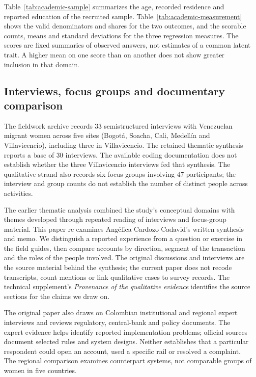 Table~\ref{tab:academic-sample} summarizes the age, recorded residence and reported education of the recruited sample. Table~\ref{tab:academic-measurement} shows the valid denominators and shares for the two outcomes, and the scorable counts, means and standard deviations for the three regression measures. The scores are fixed summaries of observed answers, not estimates of a common latent trait. A higher mean on one score than on another does not show greater inclusion in that domain.




\subsection{Interviews, focus groups and documentary comparison}

The fieldwork archive records 33 semistructured interviews with Venezuelan migrant women across five sites (Bogotá, Soacha, Cali, Medellín and Villavicencio), including three in Villavicencio. The retained thematic synthesis reports a base of 30 interviews. The available coding documentation does not establish whether the three Villavicencio interviews fed that synthesis. The qualitative strand also records six focus groups involving 47 participants; the interview and group counts do not establish the number of distinct people across activities.

The earlier thematic analysis combined the study's conceptual domains with themes developed through repeated reading of interviews and focus-group material. This paper re-examines Angélica Cardozo Cadavid's written synthesis and memo. We distinguish a reported experience from a question or exercise in the field guides, then compare accounts by direction, segment of the transaction and the roles of the people involved. The original discussions and interviews are the source material behind the synthesis; the current paper does not recode transcripts, count mentions or link qualitative cases to survey records. The technical supplement's \emph{Provenance of the qualitative evidence} identifies the source sections for the claims we draw on.

The original paper also draws on Colombian institutional and regional expert interviews and reviews regulatory, central-bank and policy documents. The expert evidence helps identify reported implementation problems; official sources document selected rules and system designs. Neither establishes that a particular respondent could open an account, used a specific rail or resolved a complaint. The regional comparison examines counterpart systems, not comparable groups of women in five countries.

